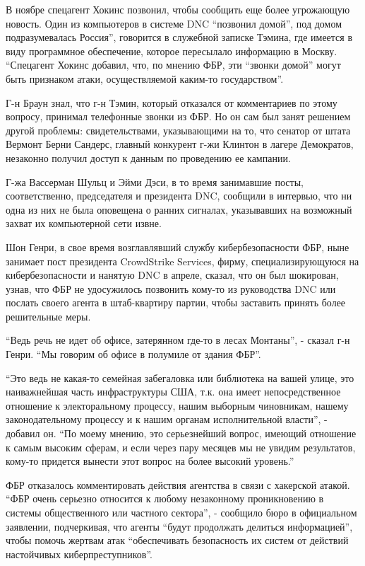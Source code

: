 В ноябре спецагент Хокинс позвонил, чтобы сообщить еще более угрожающую
новость. Один из компьютеров в системе DNC ``позвонил домой'', под домом
подразумевалась Россия'', говорится в служебной записке Тэмина, где
имеется в виду программное обеспечение, которое пересылало информацию в
Москву. ``Спецагент Хокинс добавил, что, по мнению ФБР, эти ``звонки
домой'' могут быть признаком атаки, осуществляемой каким-то
государством''.

Г-н Браун знал, что г-н Тэмин, который отказался от комментариев по
этому вопросу, принимал телефонные звонки из ФБР. Но он сам был занят
решением другой проблемы: свидетельствами, указывающими на то, что
сенатор от штата Вермонт Берни Сандерс, главный конкурент г-жи Клинтон в
лагере Демократов, незаконно получил доступ к данным по проведению ее
кампании.

Г-жа Вассерман Шульц и Эйми Дэси, в то время занимавшие посты,
соответственно, председателя и президента DNC, сообщили в интервью, что
ни одна из них не была оповещена о ранних сигналах, указывавших на
возможный захват их компьютерной сети извне.

Шон Генри, в свое время возглавлявший службу кибербезопасности ФБР, ныне
занимает пост президента CrowdStrike Services, фирму, специализирующуюся
на кибербезопасности и нанятую DNC в апреле, сказал, что он был
шокирован, узнав, что ФБР не удосужилось позвонить кому-то из
руководства DNC или послать своего агента в штаб-квартиру партии, чтобы
заставить принять более решительные меры.

``Ведь речь не идет об офисе, затерянном где-то в лесах Монтаны'', -
сказал г-н Генри. ``Мы говорим об офисе в полумиле от здания ФБР''.

``Это ведь не какая-то семейная забегаловка или библиотека на вашей
улице, это наиважнейшая часть инфраструктуры США, т.к. она имеет
непосредственное отношение к электоральному процессу, нашим выборным
чиновникам, нашему законодательному процессу и к нашим органам
исполнительной власти'', - добавил он. ``По моему мнению, это
серьезнейший вопрос, имеющий отношение к самым высоким сферам, и если
через пару месяцев мы не увидим результатов, кому-то придется вынести
этот вопрос на более высокий уровень.''

ФБР отказалось комментировать действия агентства в связи с хакерской
атакой. ``ФБР очень серьезно относится к любому незаконному
проникновению в системы общественного или частного сектора'', - сообщило
бюро в официальном заявлении, подчеркивая, что агенты ``будут продолжать
делиться информацией'', чтобы помочь жертвам атак ``обеспечивать
безопасность их систем от действий настойчивых киберпреступников''.

